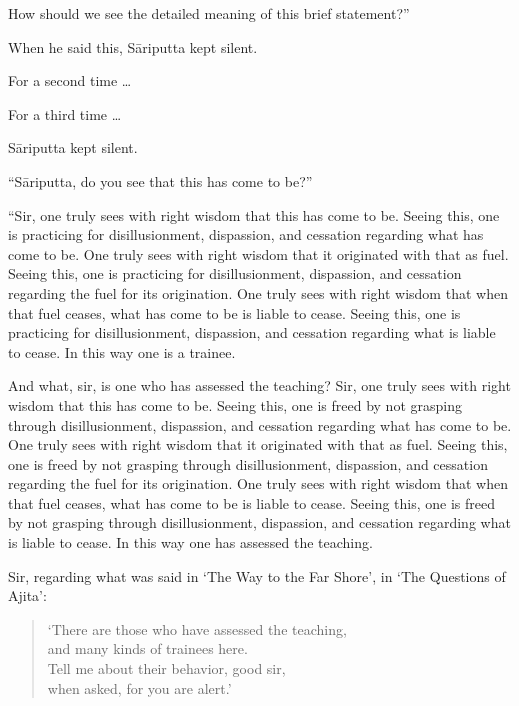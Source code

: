 \documentclass[12pt,openany]{book}%
\begin{document}
How should we see the detailed meaning of this brief statement?” 

When he said this, \textsanskrit{Sāriputta} kept silent. 

For a second time … 

For a third time … 

\textsanskrit{Sāriputta} kept silent. 

“\textsanskrit{Sāriputta}, do you see that this has come to be?” 

“Sir, one truly sees with right wisdom that this has come to be. Seeing this, one is practicing for disillusionment, dispassion, and cessation regarding what has come to be. One truly sees with right wisdom that it originated with that as fuel. Seeing this, one is practicing for disillusionment, dispassion, and cessation regarding the fuel for its origination. One truly sees with right wisdom that when that fuel ceases, what has come to be is liable to cease. Seeing this, one is practicing for disillusionment, dispassion, and cessation regarding what is liable to cease. In this way one is a trainee. 

And what, sir, is one who has assessed the teaching? Sir, one truly sees with right wisdom that this has come to be. Seeing this, one is freed by not grasping through disillusionment, dispassion, and cessation regarding what has come to be. One truly sees with right wisdom that it originated with that as fuel. Seeing this, one is freed by not grasping through disillusionment, dispassion, and cessation regarding the fuel for its origination. One truly sees with right wisdom that when that fuel ceases, what has come to be is liable to cease. Seeing this, one is freed by not grasping through disillusionment, dispassion, and cessation regarding what is liable to cease. In this way one has assessed the teaching. 

Sir, regarding what was said in ‘The Way to the Far Shore’, in ‘The Questions of Ajita’: 

\begin{verse}%
‘There are those who have assessed the teaching, \\
and many kinds of trainees here. \\
Tell me about their behavior, good sir, \\
when asked, for you are alert.’ 

%
\end{verse}
\end{document}
